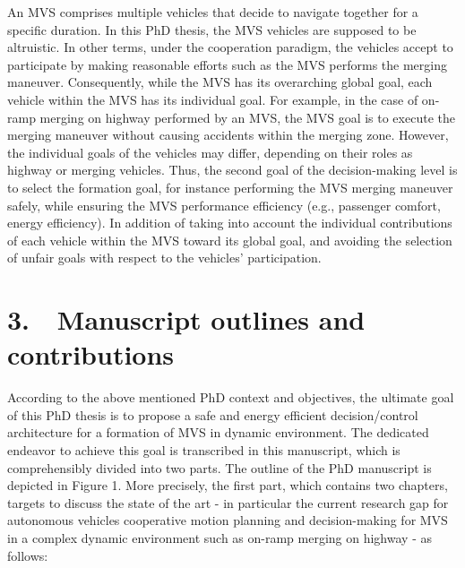 An MVS comprises multiple vehicles that decide to navigate together for a specific duration. In this PhD thesis, the MVS vehicles are supposed to be altruistic. In other terms, under the cooperation paradigm, the vehicles accept to participate by making reasonable efforts such as the MVS performs the merging maneuver. Consequently, while the MVS has its overarching global goal, each vehicle within the MVS has its individual goal. For example, in the case of on-ramp merging on highway performed by an MVS, the MVS goal is to execute the merging maneuver without causing accidents within the merging zone. However, the individual goals of the vehicles may differ, depending on their roles as highway or merging vehicles. Thus, the second goal of the decision-making level is to select the formation goal, for instance performing the MVS merging maneuver safely, while ensuring the MVS performance efficiency (e.g., passenger comfort, energy efficiency). In addition of taking into account the individual contributions of each vehicle within the MVS toward its global goal, and avoiding the selection of unfair goals with respect to the vehicles' participation. 




\section*{3.\, \,  Manuscript outlines and contributions}
According to the above mentioned PhD context and objectives, the ultimate goal of this PhD thesis is to propose a safe and energy efficient decision/control architecture for a formation of MVS in dynamic environment. The dedicated endeavor to achieve  this goal is transcribed in this manuscript, which is comprehensibly divided into two parts. The outline of the PhD manuscript is depicted in Figure 1. More precisely, the first part, which contains two chapters, targets to discuss the state of the art - in particular the current research gap for autonomous vehicles cooperative motion planning and decision-making for MVS in a complex dynamic environment such as on-ramp merging on highway - as follows: 


